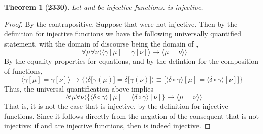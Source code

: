 \documentclass[preview]{standalone}
\newtheorem{theorem}{Theorem}
\begin{document}
\begin{theorem}[\textbf{2330}]
    Let \bm{$\delta$} and 
    \bm{$\big \langle \delta \circ \gamma \big \rangle$} 
    be injective functions.
    \bm{$\gamma$} is injective.
\end{theorem}

\begin{proof}
    By the contrapositive. Suppose that \bm{$\gamma$} were not injective. 
    Then by the definition for injective functions we have the following universally quantified statement, 
    with the domain of discourse being the domain of \bm{$\gamma$},
    \begin{equation*}
        \lnot \forall \mu \forall \nu \Big \langle
            \big \langle \gamma [\mu] = \gamma [\nu] \big \rangle
                \rightarrow 
            \big \langle \mu = \nu \big \rangle
        \Big \rangle
    \end{equation*}
    By the equality properties for equations, and by the defintion for the composition of functions,
    \begin{equation*}
        \Big \langle
            \gamma[\mu] = \gamma[\nu] 
        \Big \rangle
            \rightarrow 
        \bigg\{
            \Big \langle
                \delta \big[ \gamma(\mu) \big] 
                    = 
                \delta \big[ \gamma(\nu) \big] 
            \Big \rangle
                \equiv 
            \Big[
                \big \langle \delta \circ \gamma \big \rangle [\mu] 
                    = 
                \big \langle \delta \circ \gamma \big \rangle [\nu]
            \Big]
        \bigg\}
    \end{equation*}
    Thus, the universal quantification above implies
    \begin{equation*}
        \lnot \forall \mu \forall \nu \bigg \langle
            \Big\{
                \big \langle \delta \circ \gamma \big \rangle [\mu] 
                    = 
                \big \langle \delta \circ \gamma \big \rangle [\nu]
            \Big\}
                \rightarrow
            \big \langle \mu = \nu \big \rangle
        \bigg \rangle
    \end{equation*}
    That is, 
    it is not the case that 
    \bm{$\big \langle \delta \circ \gamma \big \rangle$} is injective, by the definition for injective functions. 
    Since it follows directly from the negation of the consequent that 
    \bm{$\big \langle \delta \circ \gamma \big \rangle$} is not injective:
    if \bm{$\delta$} and 
    \bm{$\big \langle \delta \circ \gamma \big \rangle$} 
    are injective functions, 
    then \bm{$\gamma$} is indeed injective.
\end{proof}
\end{document}
